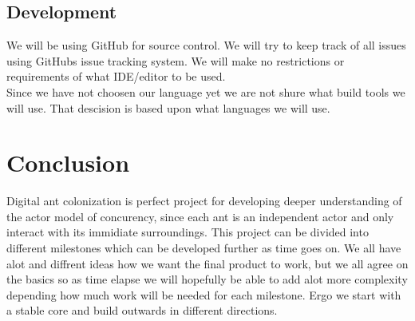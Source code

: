 \documentclass[a4paper]{article}
\begin{document}
\subsection{Development}
We will be using GitHub for source control. We will try to keep track of all
issues using GitHubs issue tracking system. We will make no restrictions or
requirements of what IDE/editor to be used.\\
Since we have not choosen our language yet we are not shure what build tools we
will use. That descision is based upon what languages we will use.



\section{Conclusion}
Digital ant colonization is perfect project for developing deeper understanding
of the actor model of concurency, since each ant is an independent actor and
only interact with its immidiate surroundings. This project can be divided into
different milestones which can be developed further as time goes on. We all have
alot and diffrent ideas how we want the final product to work, but we all agree
on the basics so as time elapse we will hopefully be able to add alot more
complexity depending how much work will be needed for each milestone. Ergo we
start with a stable core and build outwards in different directions.
\end{document}
